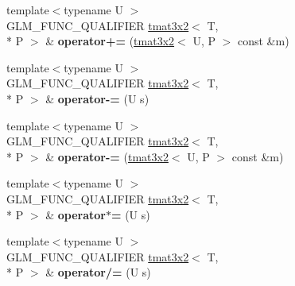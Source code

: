 \begin{DoxyCompactItemize}
\item 
\hypertarget{structglm_1_1detail_1_1tmat3x2_aeb063f61f41be8039bf8e5b40b40ae50}{{\footnotesize template$<$typename U $>$ }\\G\-L\-M\-\_\-\-F\-U\-N\-C\-\_\-\-Q\-U\-A\-L\-I\-F\-I\-E\-R \hyperlink{structglm_1_1detail_1_1tmat3x2}{tmat3x2}$<$ T, \\*
P $>$ \& {\bfseries operator+=} (\hyperlink{structglm_1_1detail_1_1tmat3x2}{tmat3x2}$<$ U, P $>$ const \&m)}\label{structglm_1_1detail_1_1tmat3x2_aeb063f61f41be8039bf8e5b40b40ae50}

\item 
\hypertarget{structglm_1_1detail_1_1tmat3x2_af77215fb32bc46ef8b32f044ef9bdab6}{{\footnotesize template$<$typename U $>$ }\\G\-L\-M\-\_\-\-F\-U\-N\-C\-\_\-\-Q\-U\-A\-L\-I\-F\-I\-E\-R \hyperlink{structglm_1_1detail_1_1tmat3x2}{tmat3x2}$<$ T, \\*
P $>$ \& {\bfseries operator-\/=} (U s)}\label{structglm_1_1detail_1_1tmat3x2_af77215fb32bc46ef8b32f044ef9bdab6}

\item 
\hypertarget{structglm_1_1detail_1_1tmat3x2_a27015cfc43f110539d46ab697ce67d4b}{{\footnotesize template$<$typename U $>$ }\\G\-L\-M\-\_\-\-F\-U\-N\-C\-\_\-\-Q\-U\-A\-L\-I\-F\-I\-E\-R \hyperlink{structglm_1_1detail_1_1tmat3x2}{tmat3x2}$<$ T, \\*
P $>$ \& {\bfseries operator-\/=} (\hyperlink{structglm_1_1detail_1_1tmat3x2}{tmat3x2}$<$ U, P $>$ const \&m)}\label{structglm_1_1detail_1_1tmat3x2_a27015cfc43f110539d46ab697ce67d4b}

\item 
\hypertarget{structglm_1_1detail_1_1tmat3x2_af59d2d25557d16f13ff7fd79fa94bfd0}{{\footnotesize template$<$typename U $>$ }\\G\-L\-M\-\_\-\-F\-U\-N\-C\-\_\-\-Q\-U\-A\-L\-I\-F\-I\-E\-R \hyperlink{structglm_1_1detail_1_1tmat3x2}{tmat3x2}$<$ T, \\*
P $>$ \& {\bfseries operator$\ast$=} (U s)}\label{structglm_1_1detail_1_1tmat3x2_af59d2d25557d16f13ff7fd79fa94bfd0}

\item 
\hypertarget{structglm_1_1detail_1_1tmat3x2_ab8db479d66f6b4cac2c02b9e5a2e40d8}{{\footnotesize template$<$typename U $>$ }\\G\-L\-M\-\_\-\-F\-U\-N\-C\-\_\-\-Q\-U\-A\-L\-I\-F\-I\-E\-R \hyperlink{structglm_1_1detail_1_1tmat3x2}{tmat3x2}$<$ T, \\*
P $>$ \& {\bfseries operator/=} (U s)}\label{structglm_1_1detail_1_1tmat3x2_ab8db479d66f6b4cac2c02b9e5a2e40d8}

\end{DoxyCompactItemize}


